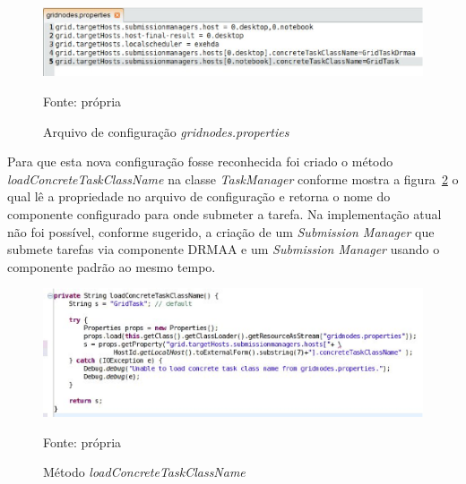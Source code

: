 \begin{figure}[htb]
\begin{center}
\includegraphics[scale=0.5]{./img/gridnodes_properties.eps}
\caption{Arquivo de configuração \emph{gridnodes.properties}}
\label{fig:gridonodes_properties}
Fonte: própria
\end{center}
\end{figure}

Para que esta nova configuração fosse reconhecida foi criado o método \emph{loadConcreteTaskClassName} na classe \emph{TaskManager} conforme mostra a figura~\ref{fig:Concrete} o qual lê a propriedade no arquivo de configuração e retorna o nome do componente configurado para onde submeter a tarefa. Na implementação atual não foi possível, conforme sugerido, a criação de um \emph{Submission Manager} que submete tarefas via componente DRMAA e um \emph{Submission Manager} usando o componente padrão ao mesmo tempo.

\begin{figure}[htb]
\begin{center}
\includegraphics[scale=0.7]{./img/concrete.eps}
\caption{Método \emph{loadConcreteTaskClassName}}
\label{fig:Concrete}
Fonte: própria
\end{center}
\end{figure}